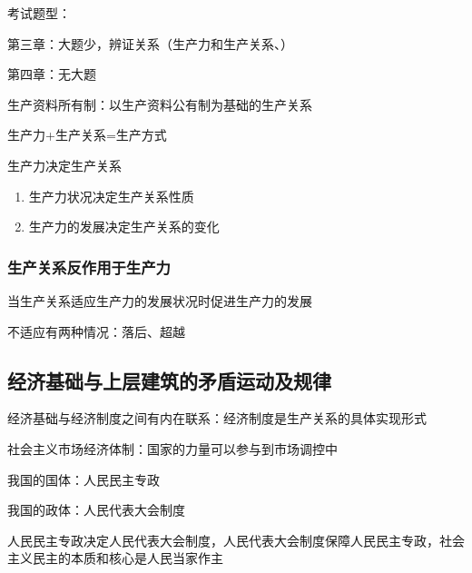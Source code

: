 考试题型：

第三章：大题少，辨证关系（生产力和生产关系、）

第四章：无大题

\begin{notation}
生产资料所有制：以生产资料公有制为基础的生产关系

生产力+生产关系=生产方式

生产力决定生产关系
\end{notation}
\begin{enumerate}
    \item 生产力状况决定生产关系性质
    \item 生产力的发展决定生产关系的变化
\end{enumerate}
\subsubsection*{生产关系反作用于生产力}%
\label{subsub:生产关系反作用于生产力}
当生产关系适应生产力的发展状况时促进生产力的发展
\begin{notation}
    不适应有两种情况：落后、超越
\end{notation}
\subsection{经济基础与上层建筑的矛盾运动及规律}%
\label{sub:经济基础与上层建筑的矛盾运动及规律}
\begin{notation}
    经济基础与经济制度之间有内在联系：经济制度是生产关系的具体实现形式
\end{notation}
社会主义市场经济体制：国家的力量可以参与到市场调控中
\begin{notation}
    我国的国体：人民民主专政

    我国的政体：人民代表大会制度

    人民民主专政决定人民代表大会制度，人民代表大会制度保障人民民主专政，社会主义民主的本质和核心是人民当家作主
\end{notation}
